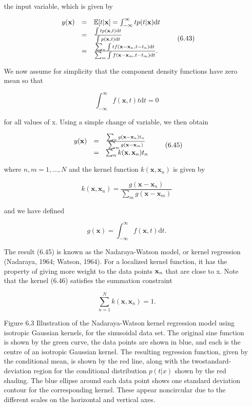 \documentclass[
  10
]{article}
\begin{document}
the input variable, which is given by

\[
\begin{array}{r c l} y (\mathbf {x}) & = & \mathbb {E} [ t | \mathbf {x} ] = \int_ {- \infty} ^ {\infty} t p (t | \mathbf {x})   \mathrm{d} t \\ & = & \frac {\int t p (\mathbf {x} , t)   \mathrm{d} t}{\int p (\mathbf {x} , t)   \mathrm{d} t} \\ & = & \frac {\sum_ {n} \int t f (\mathbf {x} - \mathbf {x} _ {n} , t - t _ {n})   \mathrm{d} t}{\sum_ {m} \int f (\mathbf {x} - \mathbf {x} _ {m} , t - t _ {m})   \mathrm{d} t}. \end{array}\tag{6.43}
\]

We now assume for simplicity that the component density functions have
zero mean so that

\[
\int_ {- \infty} ^ {\infty} f (\mathbf {x}, t) t \mathrm{d} t = 0\tag{6.44}
\]

for all values of x. Using a simple change of variable, we then obtain

\[
\begin{array}{r c l} y (\mathbf {x}) & = & \frac {\sum_ {n} g (\mathbf {x} - \mathbf {x} _ {n}) t _ {n}}{\sum_ {m} g (\mathbf {x} - \mathbf {x} _ {m})} \\ & = & \sum_ {n} k (\mathbf {x}, \mathbf {x} _ {n}) t _ {n} \end{array}\tag{6.45}
\]

where \(n , m = 1 , \ldots , N\) and the kernel function
\(k ( \mathbf { x } , \mathbf { x } _ { n } )\) is given by

\[
k (\mathbf {x}, \mathbf {x} _ {n}) = \frac {g (\mathbf {x} - \mathbf {x} _ {n})}{\sum_ {m} g (\mathbf {x} - \mathbf {x} _ {m})}\tag{6.46}
\]

and we have defined

\[
g (\mathbf {x}) = \int_ {- \infty} ^ {\infty} f (\mathbf {x}, t) \mathrm{d} t.\tag{6.47}
\]

The result (6.45) is known as the Nadaraya-Watson model, or kernel
regression (Nadaraya, 1964; Watson, 1964). For a localized kernel
function, it has the property of giving more weight to the data points
\({ \bf x } _ { n }\) that are close to x. Note that the kernel (6.46)
satisfies the summation constraint

\[
\sum_ {n = 1} ^ {N} k (\mathbf {x}, \mathbf {x} _ {n}) = 1.
\]

Figure 6.3 Illustration of the Nadaraya-Watson kernel regression model
using isotropic Gaussian kernels, for the sinusoidal data set. The
original sine function is shown by the green curve, the data points are
shown in blue, and each is the centre of an isotropic Gaussian kernel.
The resulting regression function, given by the conditional mean, is
shown by the red line, along with the twostandard-deviation region for
the conditional distribution \(p ( t | x )\) shown by the red shading.
The blue ellipse around each data point shows one standard deviation
contour for the corresponding kernel. These appear noncircular due to
the different scales on the horizontal and vertical axes.
\end{document}
